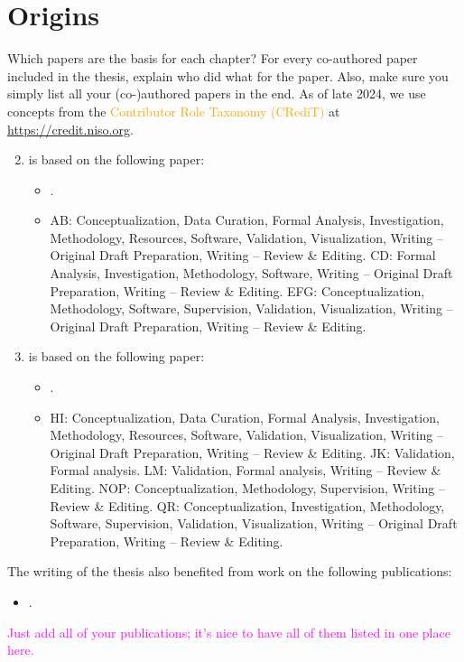
\section{Origins}
\label{section:introduction:origins}

Which papers are the basis for each chapter? For every co-authored paper included in the thesis, explain who did what for the paper. Also, make sure you simply list all your (co-)authored papers in the end. As of late 2024, we use concepts from the \textcolor{orange}{Contributor Role Taxonomy (CRediT)} at \textcolor{cyan}{\url{https://credit.niso.org}}.

\begin{enumerate}[label=\textbf{Chapter~\arabic*},align=left]
\setcounter{enumi}{1}

\item is based on the following paper:
\begin{itemize}
\item {}.
\item[] AB: Conceptualization, Data Curation, Formal Analysis, Investigation, Methodology, Resources, Software, Validation, Visualization, Writing – Original Draft Preparation, Writing – Review \& Editing. CD: Formal Analysis, Investigation, Methodology, Software, Writing – Original Draft Preparation, Writing – Review \& Editing. EFG: Conceptualization, Methodology, Software, Supervision, Validation, Visualization, Writing – Original Draft Preparation, Writing – Review \& Editing.
\end{itemize}

\item is based on the following paper:
\begin{itemize}
\item {}.
\item[] HI: Conceptualization, Data Curation, Formal Analysis, Investigation, Methodology, Resources, Software, Validation, Visualization, Writing – Original Draft Preparation, Writing – Review \& Editing. JK: Validation, Formal analysis. LM: Validation, Formal analysis, Writing – Review \& Editing. NOP: Conceptualization, Methodology, Supervision, Writing – Review \& Editing. QR: Conceptualization, Investigation, Methodology, Software, Supervision, Validation, Visualization, Writing – Original Draft Preparation, Writing – Review \& Editing.
\end{itemize}

\end{enumerate}

\noindent%
The writing of the thesis also benefited from work on the following publications:
\begin{itemize}
\item {}.
\end{itemize}
\textcolor{magenta}{Just add all of your publications; it's nice to have all of them listed in one place here.}